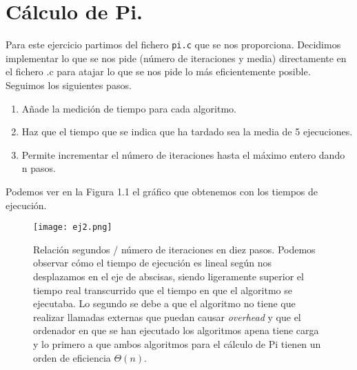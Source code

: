 \section{Cálculo de Pi.}

Para este ejercicio partimos del fichero \texttt{pi.c} que se nos proporciona. Decidimos
implementar lo que se nos pide (número de iteraciones y media) directamente en el fichero
.c para atajar lo que se nos pide lo más eficientemente posible. Seguimos los siguientes pasos.

\begin{enumerate}
    \item Añade la medición de tiempo para cada algoritmo.
    \item Haz que el tiempo que se indica que ha tardado sea la media de 5 ejecuciones.
    \item Permite incrementar el número de iteraciones hasta el máximo entero dando n pasos.
\end{enumerate}

Podemos ver en la Figura 1.1 el gráfico que obtenemos con los tiempos de ejecución. 

\begin{figure}[ht]
    \centering
    \texttt{[image: ej2.png]}
    \caption{Relación segundos / número de iteraciones en diez pasos. Podemos observar cómo el
    tiempo de ejecución es lineal según nos desplazamos en el eje de abscisas, siendo ligeramente
    superior el tiempo real transcurrido que el tiempo en que el algoritmo se ejecutaba. Lo segundo se debe
    a que el algoritmo no tiene que realizar llamadas externas que puedan causar \textit{overhead} y que el ordenador en que se han ejecutado
    los algoritmos apena tiene carga y lo primero a que ambos algoritmos para el cálculo de Pi tienen un orden de eficiencia
    $\Theta (n)$.}
\end{figure}